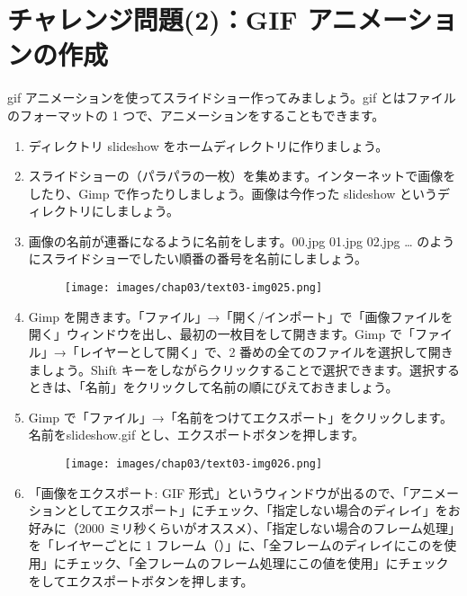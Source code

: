 \newpage
\section{チャレンジ問題(2)：GIF アニメーションの作成}
\label{GIF}
gif アニメーションを使ってスライドショー作ってみましょう。gif とはファイルのフォーマットの 1 つで、アニメーションをすることもできます。\\
\begin{enumerate}
\item ディレクトリ slideshow をホームディレクトリに作りましょう。\\
\item スライドショーの（パラパラの一枚）を集めます。インターネットで画像をしたり、Gimp で作ったりしましょう。画像は今作った slideshow というディレクトリにしましょう。\\
\item 画像の名前が連番になるように名前をします。00.jpg 01.jpg 02.jpg … のようにスライドショーでしたい順番の番号を名前にしましょう。\\
\begin{figure}[H]
    \centering
    \texttt{[image: images/chap03/text03-img025.png]}
\end{figure}
\item Gimp を開きます。「ファイル」→「開く/インポート」で「画像ファイルを開く」ウィンドウを出し、最初の一枚目をして開きます。Gimp で「ファイル」→「レイヤーとして開く」で、2 番めの全てのファイルを選択して開きましょう。Shift キーをしながらクリックすることで選択できます。選択するときは、「名前」をクリックして名前の順にびえておきましょう。\\
\item Gimp で「ファイル」→「名前をつけてエクスポート」をクリックします。名前をslideshow.gif とし、エクスポートボタンを押します。
\begin{figure}[H]
    \centering
    \texttt{[image: images/chap03/text03-img026.png]}
\end{figure}
\item 「画像をエクスポート: GIF 形式」というウィンドウが出るので、「アニメーションとしてエクスポート」にチェック、「指定しない場合のディレイ」をお好みに（2000 ミリ秒くらいがオススメ）、「指定しない場合のフレーム処理」を「レイヤーごとに 1 フレーム（）」に、「全フレームのディレイにこのを使用」にチェック、「全フレームのフレーム処理にこの値を使用」にチェックをしてエクスポートボタンを押します。\\

\end{enumerate}
